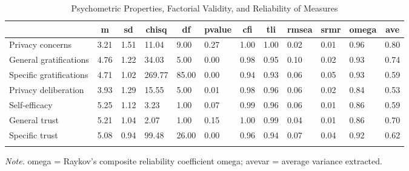 \documentclass[
  english,
  man,floatsintext]{apa6}
\begin{document}
\begin{table}[tbp]

\begin{center}
\begin{threeparttable}

\caption{\label{tab:CFA}Psychometric Properties, Factorial Validity, and Reliability of Measures}

\footnotesize{

\begin{tabular}{llllllllllll}
\toprule
 & \multicolumn{1}{c}{m} & \multicolumn{1}{c}{sd} & \multicolumn{1}{c}{chisq} & \multicolumn{1}{c}{df} & \multicolumn{1}{c}{pvalue} & \multicolumn{1}{c}{cfi} & \multicolumn{1}{c}{tli} & \multicolumn{1}{c}{rmsea} & \multicolumn{1}{c}{srmr} & \multicolumn{1}{c}{omega} & \multicolumn{1}{c}{ave}\\
\midrule
Privacy concerns & 3.21 & 1.51 & 11.04 & 9.00 & 0.27 & 1.00 & 1.00 & 0.02 & 0.01 & 0.96 & 0.80\\
General gratifications & 4.76 & 1.22 & 34.03 & 5.00 & 0.00 & 0.98 & 0.95 & 0.10 & 0.02 & 0.93 & 0.74\\
Specific gratifications & 4.71 & 1.02 & 269.77 & 85.00 & 0.00 & 0.94 & 0.93 & 0.06 & 0.05 & 0.93 & 0.59\\
Privacy deliberation & 3.93 & 1.29 & 15.55 & 5.00 & 0.01 & 0.98 & 0.96 & 0.06 & 0.02 & 0.84 & 0.53\\
Self-efficacy & 5.25 & 1.12 & 3.23 & 1.00 & 0.07 & 0.99 & 0.96 & 0.06 & 0.01 & 0.86 & 0.59\\
General trust & 5.21 & 1.04 & 2.07 & 1.00 & 0.15 & 1.00 & 0.99 & 0.04 & 0.01 & 0.86 & 0.70\\
Specific trust & 5.08 & 0.94 & 99.48 & 26.00 & 0.00 & 0.96 & 0.94 & 0.07 & 0.04 & 0.92 & 0.62\\
\bottomrule
\addlinespace
\end{tabular}

}

\begin{tablenotes}[para]
\normalsize{\textit{Note.} omega = Raykov's composite reliability coefficient omega; avevar = average variance extracted.}
\end{tablenotes}

\end{threeparttable}
\end{center}

\end{table}
\end{document}
